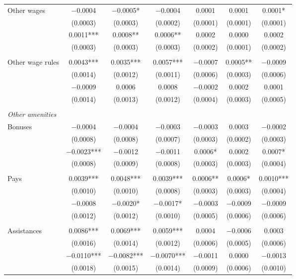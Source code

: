 \documentclass[12pt,letterpaper]{article}
\begin{document}
\begin{longtable}{l cccccc}
\quad Other wages & $-$0.0004 & $-$0.0005* & $-$0.0004 & 0.0001 & 0.0001 & 0.0001* \\
  & (0.0003) & (0.0003) & (0.0002) & (0.0001) & (0.0001) & (0.0001) \\
  & 0.0011*** & 0.0008** & 0.0006** & 0.0002 & 0.0000 & 0.0002 \\
  & (0.0003) & (0.0003) & (0.0003) & (0.0002) & (0.0001) & (0.0002) \\
 & & & & & & \\
\quad Other wage rules & 0.0043*** & 0.0035*** & 0.0057*** & $-$0.0007 & 0.0005** & $-$0.0009 \\
  & (0.0014) & (0.0012) & (0.0011) & (0.0006) & (0.0003) & (0.0006) \\
  & $-$0.0009 & 0.0006 & 0.0008 & $-$0.0002 & 0.0002 & 0.0001 \\
  & (0.0014) & (0.0013) & (0.0012) & (0.0004) & (0.0003) & (0.0005) \\
 & & & & & & \\
\midrule
\multicolumn{7}{l}{\textit{Other amenities}} \\
\quad Bonuses & $-$0.0004 & $-$0.0004 & $-$0.0003 & $-$0.0003 & 0.0003 & $-$0.0002 \\
  & (0.0008) & (0.0008) & (0.0007) & (0.0003) & (0.0002) & (0.0003) \\
  & $-$0.0023*** & $-$0.0012 & $-$0.0011 & 0.0006* & 0.0002 & 0.0007* \\
  & (0.0008) & (0.0009) & (0.0008) & (0.0003) & (0.0003) & (0.0004) \\
 & & & & & & \\
\quad Pays & 0.0039*** & 0.0048*** & 0.0039*** & 0.0006** & 0.0006* & 0.0010*** \\
  & (0.0010) & (0.0010) & (0.0008) & (0.0003) & (0.0003) & (0.0004) \\
  & $-$0.0008 & $-$0.0020* & $-$0.0017* & $-$0.0003 & $-$0.0009 & $-$0.0009 \\
  & (0.0012) & (0.0012) & (0.0010) & (0.0005) & (0.0006) & (0.0006) \\
 & & & & & & \\
\quad Assistances & 0.0086*** & 0.0069*** & 0.0059*** & 0.0004 & $-$0.0006 & 0.0003 \\
  & (0.0016) & (0.0014) & (0.0012) & (0.0006) & (0.0005) & (0.0006) \\
  & $-$0.0110*** & $-$0.0082*** & $-$0.0070*** & $-$0.0011 & 0.0000 & $-$0.0013 \\
  & (0.0018) & (0.0015) & (0.0014) & (0.0009) & (0.0006) & (0.0010) \\

\end{longtable}
\end{document}
